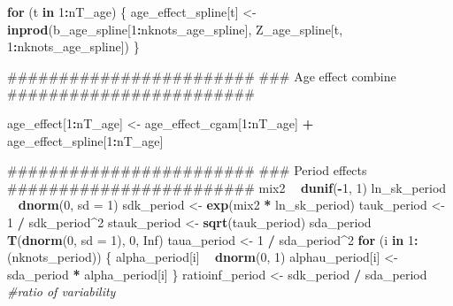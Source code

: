 \documentclass[11pt,]{article}
\newenvironment{Shaded}{\begin{snugshade}}{\end{snugshade}}
\newcommand{\KeywordTok}[1]{\textcolor[rgb]{0.13,0.29,0.53}{\textbf{#1}}}
\newcommand{\DataTypeTok}[1]{\textcolor[rgb]{0.13,0.29,0.53}{#1}}
\newcommand{\DecValTok}[1]{\textcolor[rgb]{0.00,0.00,0.81}{#1}}
\newcommand{\StringTok}[1]{\textcolor[rgb]{0.31,0.60,0.02}{#1}}
\newcommand{\CommentTok}[1]{\textcolor[rgb]{0.56,0.35,0.01}{\textit{#1}}}
\newcommand{\OtherTok}[1]{\textcolor[rgb]{0.56,0.35,0.01}{#1}}
\newcommand{\ControlFlowTok}[1]{\textcolor[rgb]{0.13,0.29,0.53}{\textbf{#1}}}
\newcommand{\OperatorTok}[1]{\textcolor[rgb]{0.81,0.36,0.00}{\textbf{#1}}}
\newcommand{\NormalTok}[1]{#1}
\begin{document}
\begin{Shaded}
\begin{Highlighting}[]
  \ControlFlowTok{for}\NormalTok{ (t }\ControlFlowTok{in} \DecValTok{1}\OperatorTok{:}\NormalTok{nT_age) \{}
\NormalTok{      age_effect_spline[t] <-}\StringTok{ }\KeywordTok{inprod}\NormalTok{(b_age_spline[}\DecValTok{1}\OperatorTok{:}\NormalTok{nknots_age_spline],}
\NormalTok{                                     Z_age_spline[t, }\DecValTok{1}\OperatorTok{:}\NormalTok{nknots_age_spline])}
\NormalTok{  \}}

\NormalTok{  ########################}
\NormalTok{  ### Age effect combine}
\NormalTok{  ########################}

\NormalTok{  age_effect[}\DecValTok{1}\OperatorTok{:}\NormalTok{nT_age] <-}\StringTok{ }\NormalTok{age_effect_cgam[}\DecValTok{1}\OperatorTok{:}\NormalTok{nT_age] }\OperatorTok{+}\StringTok{ }
\StringTok{                          }\NormalTok{age_effect_spline[}\DecValTok{1}\OperatorTok{:}\NormalTok{nT_age]}

\NormalTok{  ########################}
\NormalTok{  ### Period effects}
\NormalTok{  ########################}
\NormalTok{  mix2 }\OperatorTok{~}\StringTok{ }\KeywordTok{dunif}\NormalTok{(}\OperatorTok{-}\DecValTok{1}\NormalTok{, }\DecValTok{1}\NormalTok{)}
\NormalTok{  ln_sk_period }\OperatorTok{~}\StringTok{ }\KeywordTok{dnorm}\NormalTok{(}\DecValTok{0}\NormalTok{, }\DataTypeTok{sd =} \DecValTok{1}\NormalTok{)}
\NormalTok{  sdk_period <-}\StringTok{ }\KeywordTok{exp}\NormalTok{(mix2 }\OperatorTok{*}\StringTok{ }\NormalTok{ln_sk_period)}
\NormalTok{  tauk_period <-}\StringTok{ }\DecValTok{1} \OperatorTok{/}\StringTok{ }\NormalTok{sdk_period}\OperatorTok{^}\DecValTok{2}
\NormalTok{  stauk_period <-}\StringTok{ }\KeywordTok{sqrt}\NormalTok{(tauk_period)}
\NormalTok{  sda_period }\OperatorTok{~}\StringTok{ }\KeywordTok{T}\NormalTok{(}\KeywordTok{dnorm}\NormalTok{(}\DecValTok{0}\NormalTok{, }\DataTypeTok{sd =} \DecValTok{1}\NormalTok{), }\DecValTok{0}\NormalTok{, }\OtherTok{Inf}\NormalTok{)}
\NormalTok{  taua_period <-}\StringTok{ }\DecValTok{1} \OperatorTok{/}\StringTok{ }\NormalTok{sda_period}\OperatorTok{^}\DecValTok{2}
  \ControlFlowTok{for}\NormalTok{ (i }\ControlFlowTok{in} \DecValTok{1}\OperatorTok{:}\NormalTok{(nknots_period)) \{}
\NormalTok{    alpha_period[i] }\OperatorTok{~}\StringTok{ }\KeywordTok{dnorm}\NormalTok{(}\DecValTok{0}\NormalTok{, }\DecValTok{1}\NormalTok{)}
\NormalTok{    alphau_period[i] <-}\StringTok{ }\NormalTok{sda_period }\OperatorTok{*}\StringTok{ }\NormalTok{alpha_period[i]}
\NormalTok{  \}}
\NormalTok{  ratioinf_period <-}\StringTok{ }\NormalTok{sdk_period }\OperatorTok{/}\StringTok{ }\NormalTok{sda_period }\CommentTok{#ratio of variability}
 

\end{Highlighting}
\end{Shaded}
\end{document}
